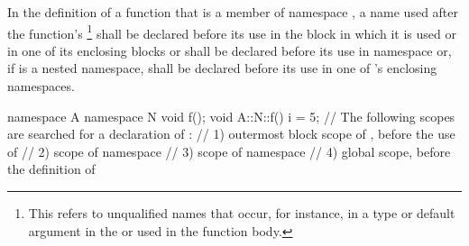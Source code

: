 \pnum
In the definition of a function that is a member of namespace ,
a name used after the function's
\footnote{This refers to unqualified names
that occur, for instance, in
a type or default argument in the
 or used in the function body.}
shall be
declared before its use in the block in which it is used or in one of
its enclosing blocks or shall be declared before its
use in namespace  or, if  is a nested namespace, shall
be declared before its use in one of 's enclosing namespaces.
\begin{example}
\begin{codeblock}
namespace A {
  namespace N {
    void f();
  }
}
void A::N::f() {
  i = 5;
  // The following scopes are searched for a declaration of :
  // 1) outermost block scope of , before the use of 
  // 2) scope of namespace 
  // 3) scope of namespace 
  // 4) global scope, before the definition of 
}
\end{codeblock}
\end{example}

